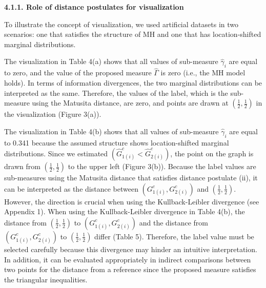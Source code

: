 \documentclass[a4j,12pt]{article}
\begin{document}
\noindent \textbf{\large 4.1.1. Role of distance postulates for visualization}

To illustrate the concept of visualization, we used artificial datasets in two scenarios: one that satisfies the structure of MH and one that has location-shifted marginal distributions. 

The visualization in Table 4(a) shows that all values of sub-measure $\hat{\gamma}_i$ are equal to zero, and the value of the proposed measure $\hat{\Gamma}$ is zero (i.e., the MH model holds). 
In terms of information divergences, the two marginal distributions can be interpreted as the same. 
Therefore, the values of the label, which is the sub-measure using the Matusita distance, are zero, and points are drawn at $\left( \frac{1}{2}, \frac{1}{2} \right)$ in the visualization (Figure 3(a)). 

The visualization in Table 4(b) shows that all values of sub-measure $\hat{\gamma}_i$ are equal to 0.341 because the assumed structure shows location-shifted marginal distributions. 
Since we estimated $\left(\hat{G}^c_{1(i)} < \hat{G}^c_{2(i)}\right)$, the point on the graph is drawn from $\left( \frac{1}{2}, \frac{1}{2} \right)$ to the upper left (Figure 3(b)). 
Because the label values are sub-measures using the Matusita distance that satisfies distance postulate (ii), it can be interpreted as the distance between $\left( G^c_{1(i)}, G^c_{2(i)} \right)$ and $\left( \frac{1}{2}, \frac{1}{2} \right)$.
However, the direction is crucial when using the Kullback-Leibler divergence (see Appendix 1). 
When using the Kullback-Leibler divergence in Table 4(b), the distance from $\left( \frac{1}{2}, \frac{1}{2} \right)$ to $\left( G^c_{1(i)}, G^c_{2(i)} \right)$ and the distance from $\left( G^c_{1(i)}, G^c_{2(i)} \right)$ to $\left( \frac{1}{2}, \frac{1}{2} \right)$ differ (Table 5). 
Therefore, the label value must be selected carefully because this divergence may hinder an intuitive interpretation. 
In addition, it can be evaluated appropriately in indirect comparisons between two points for the distance from a reference since the proposed measure satisfies the triangular inequalities.
\end{document}
